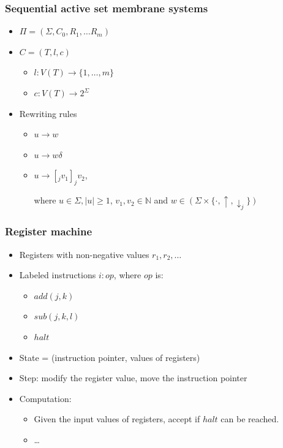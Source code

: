     \begin{frame}[t]\frametitle{Sequential active set membrane systems}
      \begin{itemize}
        \item $\Pi = (\Sigma, C_0, R_1, \ldots R_m)$
        \pause
        \item $C = (T, l, c)$
        \begin{itemize}
          \item $l: V(T) \rightarrow \{1, \ldots, m\}$
          \item $c: V(T) \rightarrow 2^\Sigma$
        \end{itemize}
        \pause
        \item Rewriting rules
        \begin{itemize}
          \item $u\rightarrow w$
          \item $u\rightarrow w\delta$
          \item $u\rightarrow [_j v_1]_j v_2$,

          where $u \in \Sigma, |u|\geq 1$, $v_1,v_2\in \mathbb{N}$ and $w\in (\Sigma\times\{\cdot, \uparrow, \downarrow_{j}\})$
        \end{itemize}

      \end{itemize}
    \end{frame}
    \note{}

    \begin{frame}[t]\frametitle{Register machine}
      \begin{itemize}
        \item Registers with non-negative values $r_1, r_2, \ldots$
        \item Labeled instructions $i: op$, where $op$ is:
        \begin{itemize}
          \item $add(j, k)$
          \item $sub(j, k, l)$
          \item $halt$
        \end{itemize}
        \item State = (instruction pointer, values of registers)
        \item Step: modify the register value, move the instruction pointer
        \item Computation:
        \begin{itemize}
          \item Given the input values of registers, accept if $halt$ can be reached.
          \item \ldots
        \end{itemize}
      \end{itemize}
    \end{frame}

